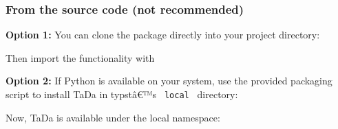 \subsubsection{From the source code (not
recommended)}\label{from-the-source-code-not-recommended}

\textbf{Option 1:} You can clone the package directly into your project
directory:

\begin{Shaded}
\begin{Highlighting}[]
\end{Highlighting}
\end{Shaded}

Then import the functionality with

\begin{Shaded}
\begin{Highlighting}[]
\end{Highlighting}
\end{Shaded}

\textbf{Option 2:} If Python is available on your system, use the
provided packaging script to install TaDa in typstâ€™s
\texttt{\ local\ } directory:

\begin{Shaded}
\begin{Highlighting}[]
  
   \DataTypeTok{\textbackslash{}}
  
\end{Highlighting}
\end{Shaded}

Now, TaDa is available under the local namespace:

\begin{Shaded}
\begin{Highlighting}[]
\end{Highlighting}
\end{Shaded}

